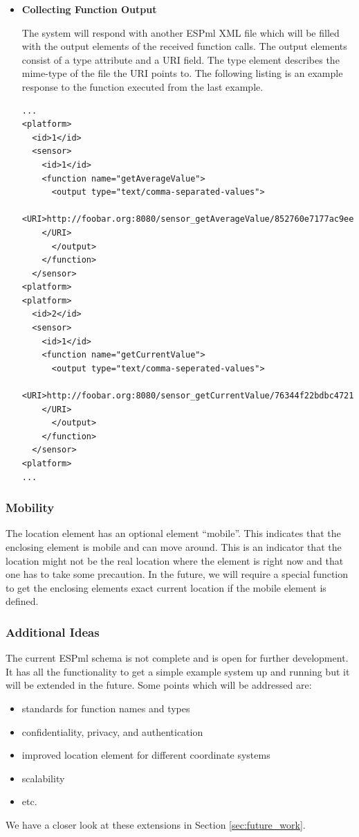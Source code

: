 \begin{itemize}
\item \textbf{Collecting Function Output}

The system will respond with another ESPml XML file which will be
filled with the output elements of the received function calls. The output
elements consist of a type attribute and a URI field. The type element
describes the mime-type of the file the URI points to. The following
listing is an example response to the function executed from the last
example. 


\lstset{basicstyle=\small,breaklines=true}
\begin{lstlisting}
...
<platform>
  <id>1</id>
  <sensor>
    <id>1</id> 
    <function name="getAverageValue">
      <output type="text/comma-separated-values">
        <URI>http://foobar.org:8080/sensor_getAverageValue/852760e7177ac9eeebcc16621ec2e83c
	</URI>
      </output>
    </function>
  </sensor>
<platform>
<platform>
  <id>2</id>
  <sensor>
    <id>1</id> 
    <function name="getCurrentValue">
      <output type="text/comma-seperated-values">
        <URI>http://foobar.org:8080/sensor_getCurrentValue/76344f22bdbc47211407b085bf5da147
	</URI>
      </output>
    </function>
  </sensor>
<platform>
...
\end{lstlisting}

\end{itemize}


\subsubsection{Mobility}
The location element has an optional element ``mobile''. This
indicates that the enclosing element is mobile and can move
around. This is an indicator that the location might not be the real
location where the element is right now and that one has to take some
precaution. In the future, we will require a special function to get
the enclosing elements exact current location if the mobile element is
defined.


\subsubsection{Additional Ideas}
The current ESPml schema is not complete and is open for further
development. It has all the functionality to get a simple example
system up and running but it will be extended in the future. Some
points which will be addressed are:
\begin{itemize}
\item standards for function names and types
\item confidentiality, privacy, and authentication
\item improved location element for different coordinate systems
\item scalability
\item etc.
\end{itemize}
We have a closer look at these extensions in Section \ref{sec:future_work}.

